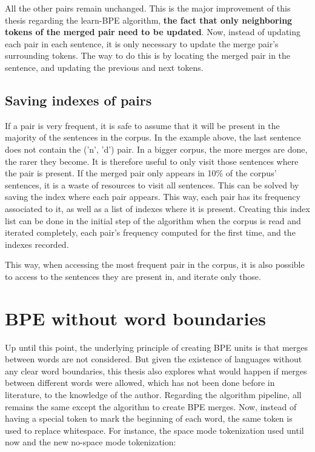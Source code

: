 All the other pairs remain unchanged. This is the major improvement of this thesis regarding the learn-BPE algorithm, \textbf{the fact that only neighboring tokens of the merged pair need to be updated}. Now, instead of updating each pair in each sentence, it is only necessary to update the merge pair's surrounding tokens. The way to do this is by locating the merged pair in the sentence, and updating the previous and next tokens.

\subsection{Saving indexes of pairs}

If a pair is very frequent, it is safe to assume that it will be present in the majority of the sentences in the corpus. In the example above, the last sentence does not contain the ('n', 'd') pair. In a bigger corpus, the more merges are done, the rarer they become. It is therefore useful to only visit those sentences where the pair is present. If the merged pair only appears in 10\% of the corpus' sentences, it is a waste of resources to visit all sentences. This can be solved by saving the index where each pair appears. This way, each pair has its frequency associated to it, as well as a list of indexes where it is present. Creating this index list can be done in the initial step of the algorithm when the corpus is read and iterated completely, each pair's frequency computed for the first time, and the indexes recorded.

This way, when accessing the most frequent pair in the corpus, it is also possible to access to the sentences they are present in, and iterate only those.

\section{BPE without word boundaries}

Up until this point, the underlying principle of creating BPE units is that merges between words are not considered. But given the existence of languages without any clear word boundaries, this thesis also explores what would happen if merges between different words were allowed, which has not been done before in literature, to the knowledge of the author. Regarding the algorithm pipeline, all remains the same except the algorithm to create BPE merges. Now, instead of having a special token to mark the beginning of each word, the same token is used to replace whitespace. For instance, the space mode tokenization used until now and the new no-space mode tokenization:

